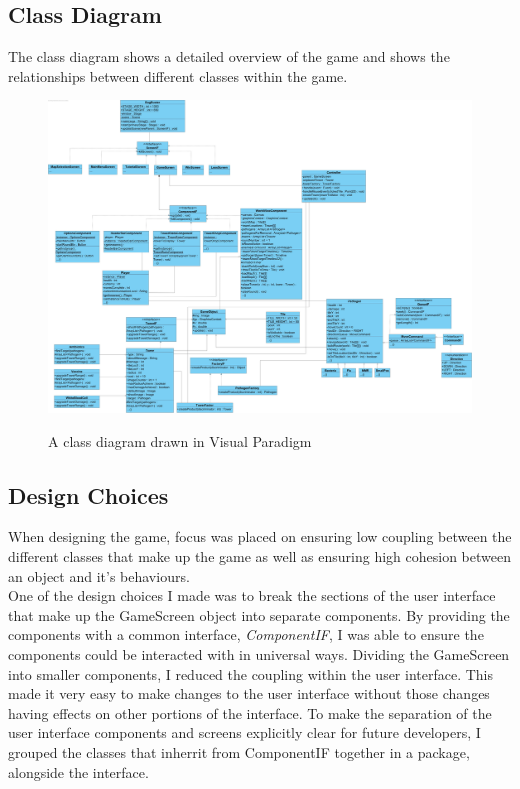 \documentclass[a4paper,12pt]{article}
\begin{document}
\subsection*{Class Diagram}
The class diagram shows a detailed overview of the game and shows the relationships between different classes within the game.
\newpage
\begin{figure}[!h]
	\begin{center}
		\includegraphics[width=23cm, angle=90, origin=h]{images/Class-Diagram.jpg}
		\\
		\caption{A class diagram drawn in Visual Paradigm}
	\end{center}
\end{figure}

\subsection*{Design Choices}
When designing the game, focus was placed on ensuring low coupling between the different classes that make up the game as well as ensuring high cohesion between an object and it's behaviours. 
\\
One of the design choices I made was to break the sections of the user interface that make up the GameScreen object into separate components. By providing the components with a common interface, \textit{ComponentIF}, I was able to ensure the components could be interacted with in universal ways. Dividing the GameScreen into smaller components, I reduced the coupling within the user interface. This made it very easy to make changes to the user interface without those changes having effects on other portions of the interface. To make the separation of the user interface components and screens explicitly clear for future developers, I grouped the classes that inherrit from ComponentIF together in a package, alongside the interface. 
\end{document}
